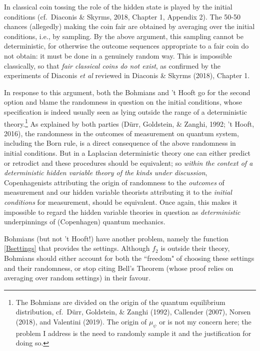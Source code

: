 \documentclass[11pt,a4paper]{article}
\numberwithin{equation}{section}
\newcommand{\qm}{quantum mechanics}
\newcommand{\er}{\eqref}
\begin{document}
In classical coin tossing the role of the hidden state is played by  the initial conditions (cf.\ Diaconis \& Skyrms, 2018, Chapter 1, Appendix 2). The 50-50 chances (allegedly) making the coin fair are obtained by averaging over the initial conditions, i.e., by sampling. By the above argument, this sampling cannot be  deterministic, for otherwise the outcome sequences appropriate to a fair coin do not obtain: it must be done in a genuinely random way. This is  impossible classically, so that \emph{fair classical coins do not exist}, as  confirmed by the experiments of Diaconis \emph{et al} reviewed in Diaconis \& Skyrms (2018), Chapter 1.

In response to this argument, both the Bohmians and 't Hooft go for the second option and blame the randomness in question on the initial conditions,  whose specification is indeed  usually seen as lying outside the range of a deterministic theory.\footnote{The Bohmians are  divided on the origin of the quantum equilibrium distribution, cf.\ 
D\"{u}rr, Goldstein, \& Zanghi (1992),  Callender (2007), Norsen (2018), and  Valentini (2019).  The origin of $\mu_{\psi}$ or  is not my concern here; the problem I address is the need to randomly sample it and the justification for doing so.
} As explained by both parties 
(D\"{u}rr, Goldstein, \& Zanghi, 1992; 't Hooft, 2016), the randomness in the outcomes of measurement on quantum system, including the Born rule, is a direct consequence of the above randomness in initial conditions. But  in a Laplacian deterministic theory  one can either predict or retrodict and these procedures should be equivalent; so \emph{within the context of a deterministic hidden variable theory of the kinds under discussion}, Copenhagenists attributing the origin of randomness to the \emph{outcomes} of measurement and our hidden variable theorists attributing it to the \emph{initial conditions} for measurement, should be equivalent. Once again, this makes it impossible to regard the hidden variable theories in question as \emph{deterministic} underpinnings of (Copenhagen) \qm.

 Bohmians (but not 't Hooft!)  have another problem, namely 
  the function \er{Bsettings} that provides the  settings.  Although $f_2$ is outside their theory,  Bohmians 
  should either account for both the ``freedom" of choosing these settings and their randomness, or stop citing Bell's Theorem  (whose proof relies on averaging over random settings) in their favour.
  
\end{document}
